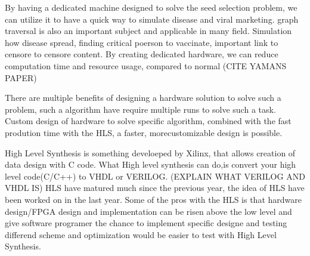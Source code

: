 By having a dedicated machine designed to solve the seed selection problem, we can utilize it to have a quick way to simulate disease and viral marketing. graph traversal is also an important subject and applicable in many field. Simulation how disease spread, finding critical poerson to vaccinate, important link to censore to censore content. By creating dedicated hardware, we can reduce computation time and resource usage, compared to normal  (CITE YAMANS PAPER)

There are multiple benefits of designing a hardware solution to solve such a problem, such a algorithm have require multiple runs to solve such a task. Custom design of hardware to solve specific algorithm, combined with the fast prodution time with the HLS, a faster, morecustomizable design is possible.

High Level Synthesis is something develoeped by Xilinx, that allows creation of data design with C code. What High level synthesis can do,is convert your high level code(C/C++) to VHDL or VERILOG. (EXPLAIN WHAT VERILOG AND VHDL IS)
HLS have matured much since the previous year, the idea of HLS have been worked on in the last year. Some of the pros with the HLS is that hardware design/FPGA design and implementation can be risen above the low level and give software programer the chance to implement specific designe and testing differend scheme and optimization would be easier to test with High Level Synthesis.
